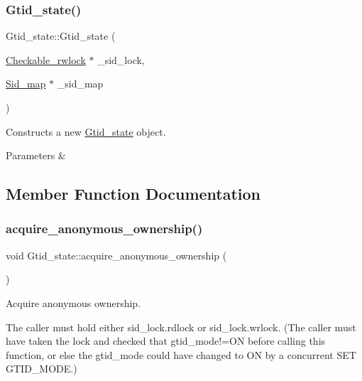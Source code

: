 \subsubsection{\texorpdfstring{Gtid\+\_\+state()}{Gtid\_state()}}
{\footnotesize\ttfamily Gtid\+\_\+state\+::\+Gtid\+\_\+state (\begin{DoxyParamCaption}\item[{\mbox{\hyperlink{classCheckable__rwlock}{Checkable\+\_\+rwlock}} $\ast$}]{\+\_\+sid\+\_\+lock,  }\item[{\mbox{\hyperlink{classSid__map}{Sid\+\_\+map}} $\ast$}]{\+\_\+sid\+\_\+map }\end{DoxyParamCaption})\hspace{0.3cm}{\ttfamily [inline]}}

Constructs a new \mbox{\hyperlink{classGtid__state}{Gtid\+\_\+state}} object.


\begin{DoxyParams}{Parameters}
{\em } & \\
\hline
\end{DoxyParams}


\subsection{Member Function Documentation}
\mbox{\label{classGtid__state_a7e259736e00e4fa5835ec9cdd34dc0ba}} 
\subsubsection{\texorpdfstring{acquire\+\_\+anonymous\+\_\+ownership()}{acquire\_anonymous\_ownership()}}
{\footnotesize\ttfamily void Gtid\+\_\+state\+::acquire\+\_\+anonymous\+\_\+ownership (\begin{DoxyParamCaption}{ }\end{DoxyParamCaption})\hspace{0.3cm}{\ttfamily [inline]}}

Acquire anonymous ownership.

The caller must hold either sid\+\_\+lock.\+rdlock or sid\+\_\+lock.\+wrlock. (The caller must have taken the lock and checked that gtid\+\_\+mode!=ON before calling this function, or else the gtid\+\_\+mode could have changed to ON by a concurrent S\+ET G\+T\+I\+D\+\_\+\+M\+O\+DE.) \mbox{\label{classGtid__state_a3bedc53a5eed5898822ede2a9d5214d6}} 
